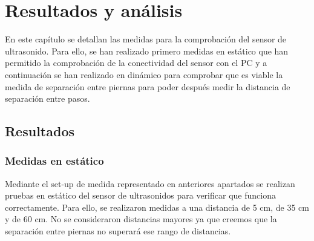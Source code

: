 \chapter{Resultados y análisis\label{sec:resultados}}
En este capítulo se detallan las medidas para la comprobación del sensor de ultrasonido. Para ello, se han realizado primero medidas en estático que han permitido la comprobación de la conectividad del sensor con el PC y a continuación se han realizado en dinámico para comprobar que es viable la medida de separación entre piernas para poder después medir la distancia de separación entre pasos.

\section{Resultados}

\subsection{Medidas en estático}

Mediante el set-up de medida representado en anteriores apartados se realizan pruebas en estático del sensor de ultrasonidos para verificar que funciona correctamente. Para ello, se realizaron medidas a una distancia de 5 cm, de 35 cm y de 60 cm. No se consideraron distancias mayores ya que creemos que la separación entre piernas no superará ese rango de distancias.

